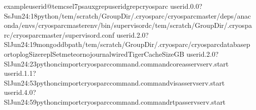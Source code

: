 \documentclass[a4paper,10pt,english]{sphinxmanual}
\begin{document}
\begin{sphinxVerbatim}[commandchars=\\\{\}]
exampleuserid@tem\PYGZhy{}cs\PYGZhy{}el7\PYGZdl{}\PYGZgt{}psauxgrep\PYGZlt{}userid\PYGZgt{}grepcryosparc
userid.0.0?SsJun24:18python/tem/scratch/\PYGZlt{}GroupDir\PYGZgt{}/.cryosparc/cryosparc\PYGZus{}master/deps/anaconda/envs/cryosparc\PYGZus{}master\PYGZus{}env/bin/supervisord\PYGZhy{}c/tem/scratch/\PYGZlt{}GroupDir\PYGZgt{}/.cryosparc/cryosparc\PYGZus{}master/supervisord.conf
userid.2.0?SlJun24:19mongod\PYGZhy{}\PYGZhy{}dbpath/tem/scratch/\PYGZlt{}GroupDir\PYGZgt{}/.cryosparc/cryosparc\PYGZus{}database\PYGZhy{}\PYGZhy{}port\PYGZhy{}\PYGZhy{}oplogSize\PYGZhy{}\PYGZhy{}replSetmeteor\PYGZhy{}\PYGZhy{}nojournal\PYGZhy{}\PYGZhy{}wiredTigerCacheSizeGB
userid.2.0?SlJun24:23python\PYGZhy{}cimportcryosparc\PYGZus{}command.command\PYGZus{}coreasservserv.start
userid.1.1?SlJun24:53python\PYGZhy{}cimportcryosparc\PYGZus{}command.command\PYGZus{}visasservserv.start
userid.4.0?SlJun24:59python\PYGZhy{}cimportcryosparc\PYGZus{}command.command\PYGZus{}rtpasservserv.start

\end{sphinxVerbatim}
\end{document}
